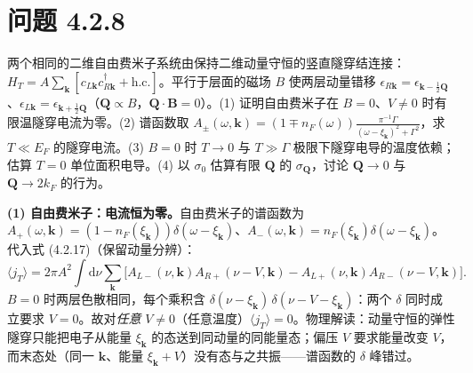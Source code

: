 \section*{问题 4.2.8}
\begin{problem}
两个相同的二维自由费米子系统由保持二维动量守恒的竖直隧穿结连接：$H_T=A\sum_{\pmb{k}}[c_{L\pmb{k}}c^\dagger_{R\pmb{k}}+\text{h.c.}]$。平行于层面的磁场 $B$ 使两层动量错移 $\epsilon_{R\pmb{k}}=\epsilon_{\pmb{k}-\frac12\pmb{Q}}$、$\epsilon_{L\pmb{k}}=\epsilon_{\pmb{k}+\frac12\pmb{Q}}$（$\pmb{Q}\propto B$，$\pmb{Q}\cdot\pmb{B}=0$）。(1) 证明自由费米子在 $B=0$、$V\neq0$ 时有限温隧穿电流为零。(2) 谱函数取 $A_{\pm}(\omega,\pmb{k})=(1\mp n_F(\omega))\frac{\pi^{-1}\Gamma}{(\omega-\xi_{\pmb{k}})^2+\Gamma^2}$，求 $T\ll E_F$ 的隧穿电流。(3) $B=0$ 时 $T\to0$ 与 $T\gg\Gamma$ 极限下隧穿电导的温度依赖；估算 $T=0$ 单位面积电导。(4) 以 $\sigma_0$ 估算有限 $\pmb{Q}$ 的 $\sigma_{\pmb{Q}}$，讨论 $\pmb{Q}\to0$ 与 $\pmb{Q}\to2k_F$ 的行为。
\end{problem}
\solution
\textbf{(1) 自由费米子：电流恒为零。}自由费米子的谱函数为 $A_+(\omega,\pmb{k})=(1-n_F(\xi_{\pmb{k}}))\delta(\omega-\xi_{\pmb{k}})$、$A_-(\omega,\pmb{k})=n_F(\xi_{\pmb{k}})\delta(\omega-\xi_{\pmb{k}})$。代入式 (4.2.17)（保留动量分辨）：
\begin{equation*}
\langle j_T\rangle=2\pi A^2\!\int\!\mathrm{d}\nu\sum_{\pmb{k}}\Big[A_{L-}(\nu,\pmb{k})A_{R+}(\nu-V,\pmb{k})-A_{L+}(\nu,\pmb{k})A_{R-}(\nu-V,\pmb{k})\Big].
\end{equation*}
$B=0$ 时两层色散相同，每个乘积含 $\delta(\nu-\xi_{\pmb{k}})\,\delta(\nu-V-\xi_{\pmb{k}})$：两个 $\delta$ 同时成立要求 $V=0$。故对\emph{任意} $V\neq0$（任意温度）$\langle j_T\rangle=0$。物理解读：动量守恒的弹性隧穿只能把电子从能量 $\xi_{\pmb{k}}$ 的态送到同动量的同能量态；偏压 $V$ 要求能量改变 $V$，而末态处（同一 $\pmb{k}$、能量 $\xi_{\pmb{k}}+V$）没有态与之共振——谱函数的 $\delta$ 峰错过。


